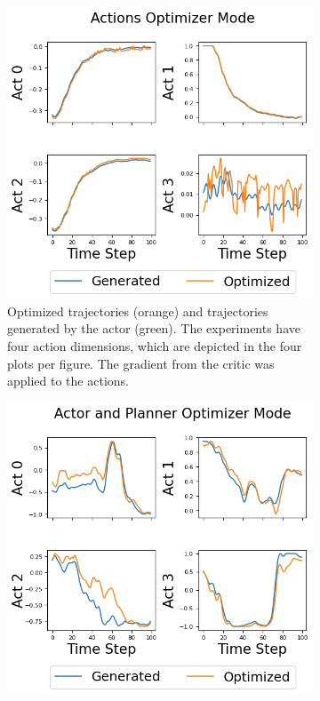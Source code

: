 \begin{figure}[htbp]
  \begin{subfigure}{0.48\textwidth}
    \includegraphics[width=\textwidth]{images/Plan_vs_Actions/vector_changes/Actions Optimizer Mode.png}
    \caption{Optimized trajectories (orange) and trajectories generated by the actor (green). 
    The experiments have four action dimensions, which are depicted in the 
    four plots per figure. 
    The gradient from the critic was applied to the actions.}
    \label{fig:direct_actions}
  \end{subfigure}
  \begin{subfigure}{0.48\textwidth}
    \includegraphics[width=\textwidth]{images/Plan_vs_Actions/vector_changes/Actor and Planner Optimizer Mode.png}

\end{subfigure}
\end{figure}
